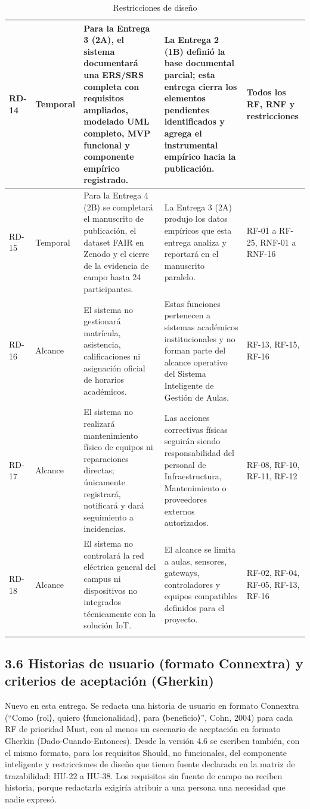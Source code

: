 \begin{longtable}{|P{0.2000}|P{0.2000}|P{0.2000}|P{0.2000}|P{0.2000}|}
RD-14 & Temporal & Para la Entrega 3 (2A), el sistema documentará una ERS/SRS completa con requisitos ampliados, modelado UML completo, MVP funcional y componente empírico registrado. & La Entrega 2 (1B) definió la base documental parcial; esta entrega cierra los elementos pendientes identificados y agrega el instrumental empírico hacia la publicación. & Todos los RF, RNF y restricciones \\ \hline
RD-15 & Temporal & Para la Entrega 4 (2B) se completará el manuscrito de publicación, el dataset FAIR en Zenodo y el cierre de la evidencia de campo hasta 24 participantes. & La Entrega 3 (2A) produjo los datos empíricos que esta entrega analiza y reportará en el manuscrito paralelo. & RF-01 a RF-25, RNF-01 a RNF-16 \\ \hline
RD-16 & Alcance & El sistema no gestionará matrícula, asistencia, calificaciones ni asignación oficial de horarios académicos. & Estas funciones pertenecen a sistemas académicos institucionales y no forman parte del alcance operativo del Sistema Inteligente de Gestión de Aulas. & RF-13, RF-15, RF-16 \\ \hline
RD-17 & Alcance & El sistema no realizará mantenimiento físico de equipos ni reparaciones directas; únicamente registrará, notificará y dará seguimiento a incidencias. & Las acciones correctivas físicas seguirán siendo responsabilidad del personal de Infraestructura, Mantenimiento o proveedores externos autorizados. & RF-08, RF-10, RF-11, RF-12 \\ \hline
RD-18 & Alcance & El sistema no controlará la red eléctrica general del campus ni dispositivos no integrados técnicamente con la solución IoT. & El alcance se limita a aulas, sensores, gateways, controladores y equipos compatibles definidos para el proyecto. & RF-02, RF-04, RF-05, RF-13, RF-16 \\ \hline
\caption{Restricciones de diseño}
\end{longtable}
\endgroup

\subsection*{3.6 Historias de usuario (formato Connextra) y criterios de aceptación (Gherkin)}


Nuevo en esta entrega. Se redacta una historia de usuario en formato Connextra (``Como ⟨rol⟩, quiero ⟨funcionalidad⟩, para ⟨beneficio⟩'', Cohn, 2004) para cada RF de prioridad Must, con al menos un escenario de aceptación en formato Gherkin (Dado-Cuando-Entonces). Desde la versión 4.6 se escriben también, con el mismo formato, para los requisitos Should, no funcionales, del componente inteligente y restricciones de diseño que tienen fuente declarada en la matriz de trazabilidad: HU-22 a HU-38. Los requisitos sin fuente de campo no reciben historia, porque redactarla exigiría atribuir a una persona una necesidad que nadie expresó.


